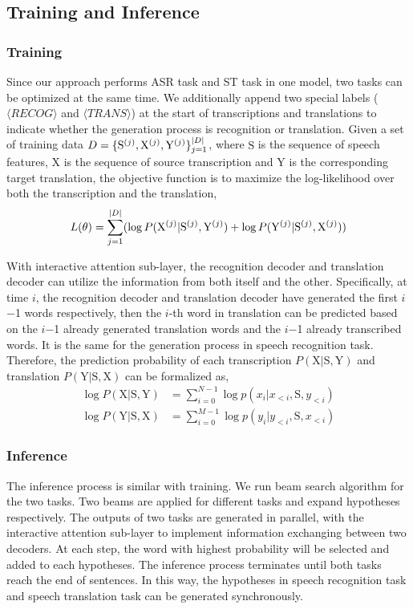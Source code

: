 \documentclass[letterpaper]{article} %
\begin{document}
\subsection{Training and Inference}
\subsubsection{Training}
Since our approach performs ASR task and ST task in one model, two tasks can be optimized at the same time. We additionally append two special labels ($\langle  RECOG\rangle$ and $\langle TRANS\rangle$) at the start of transcriptions and translations to indicate whether the generation process is recognition or translation.  Given a set of training data $\small{D=\{\mathrm{S}^{(j)},\mathrm{X}^{(j)},\mathrm{Y}^{(j)}\}_{j=1}^{|D|}}$, where $\mathrm{S}$ is the sequence of speech features, $\mathrm{X}$ is the sequence of source transcription and $\mathrm{Y}$ is the corresponding target translation, the objective function is to maximize the log-likelihood over both the transcription and the translation,
\begin{equation}
\small
L(\theta)=\sum_{j=1}^{|D|} (\log P(\mathrm{X}^{(j)}|\mathrm{S}^{(j)},\mathrm{Y}^{(j)}) + \log P(\mathrm{Y}^{(j)}|\mathrm{S}^{(j)},\mathrm{X}^{(j)}))
\end{equation}

With interactive attention sub-layer, the recognition decoder and translation decoder can utilize the information from both itself and the other. Specifically, at time $i$, the recognition decoder and translation decoder have generated the first $i$$-$1 words respectively, then the $i$-th word in translation can be predicted based on the $i$$-$1 already generated translation words and the $i$$-$1 already transcribed words. It is the same for the generation process in speech recognition task. Therefore, the prediction probability of each transcription $ P(\mathrm{X}|\mathrm{S},\mathrm{Y})$ and translation $ P(\mathrm{Y}|\mathrm{S},\mathrm{X})$ can be formalized as,
\begin{align}
\log P(\mathrm{X}|\mathrm{S},\mathrm{Y}) &= \sum_{i=0}^{N-1} \log p(x_{i}|x_{<i},\mathrm{S},y_{<i}) \\
\log P(\mathrm{Y}|\mathrm{S},\mathrm{X}) &= \sum_{i=0}^{M-1} \log p(y_{i}|y_{<i},\mathrm{S},x_{<i})
\end{align}

\subsubsection{Inference}
The inference process is similar with training. We run beam search algorithm for the two tasks. Two beams are applied for different tasks and expand hypotheses respectively. The outputs of two tasks are generated in parallel, with the interactive attention sub-layer to implement information exchanging between two decoders. At each step, the word with highest probability will be selected and added to each hypotheses. The inference process terminates until both tasks reach the end of sentences.  In this way, the hypotheses in speech recognition task and speech translation task can be generated synchronously.
\end{document}
